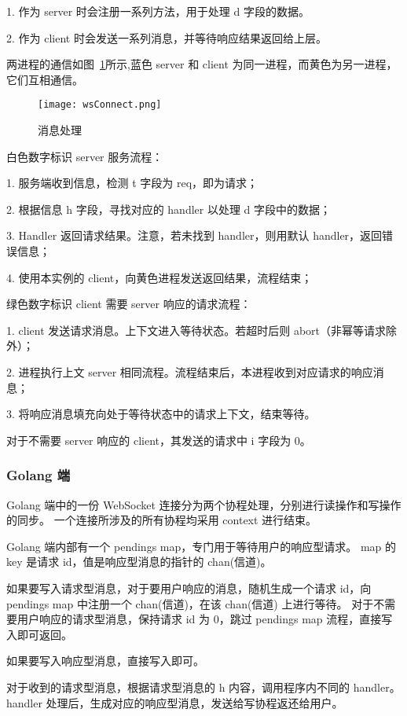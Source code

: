 1. 作为 server 时会注册一系列方法，用于处理 d 字段的数据。

2. 作为 client 时会发送一系列消息，并等待响应结果返回给上层。

两进程的通信如图~\ref{fig:wsConnect}所示,蓝色 server 和 client 为同一进程，而黄色为另一进程，它们互相通信。
\begin{figure}[!htp]
    \centering
    \texttt{[image: wsConnect.png]}
    \caption{消息处理}
    \label{fig:wsConnect}
  \end{figure}

白色数字标识 server 服务流程：

1. 服务端收到信息，检测 t 字段为 req，即为请求；

2. 根据信息 h 字段，寻找对应的 handler 以处理 d 字段中的数据；

3. Handler 返回请求结果。注意，若未找到 handler，则用默认 handler，返回错误信息；

4. 使用本实例的 client，向黄色进程发送返回结果，流程结束；

绿色数字标识 client 需要 server 响应的请求流程：

1. client 发送请求消息。上下文进入等待状态。若超时后则 abort（非幂等请求除外）；

2. 进程执行上文 server 相同流程。流程结束后，本进程收到对应请求的响应消息；

3. 将响应消息填充向处于等待状态中的请求上下文，结束等待。

对于不需要 server 响应的 client，其发送的请求中 i 字段为 0。

\subsubsection{Golang 端}
Golang 端中的一份 WebSocket 连接分为两个协程处理，分别进行读操作和写操作的同步。
一个连接所涉及的所有协程均采用 context 进行结束。

Golang 端内部有一个 pendings map，专门用于等待用户的响应型请求。
map 的 key 是请求 id，值是响应型消息的指针的 chan(信道)。

如果要写入请求型消息，对于要用户响应的消息，随机生成一个请求 id，向 pendings map 中注册一个 chan(信道)，在该 chan(信道) 上进行等待。
对于不需要用户响应的请求型消息，保持请求 id 为 0，跳过 pendings map 流程，直接写入即可返回。

如果要写入响应型消息，直接写入即可。

对于收到的请求型消息，根据请求型消息的 h 内容，调用程序内不同的 handler。handler 处理后，生成对应的响应型消息，发送给写协程返还给用户。


